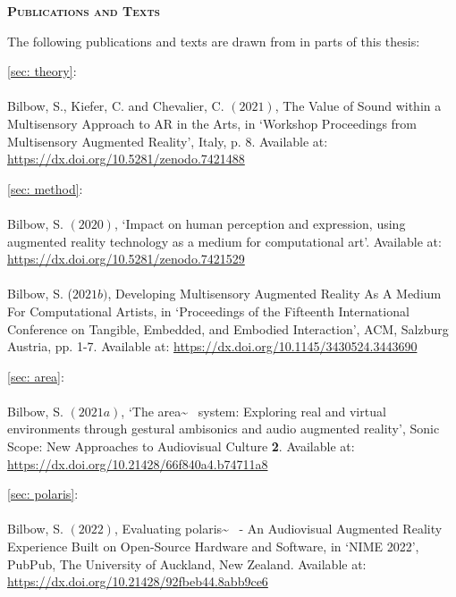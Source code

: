 \newpage
{}
\begin{flushleft}
	\Huge \textsc{\textbf{Publications and Texts}}

\end{flushleft}
\noindent The following publications and texts are drawn from in parts of this thesis:

\noindent\autoref{sec: theory}:  \\ \citep{bilbow2021} \\ Bilbow, S., Kiefer, C. and Chevalier, C. $(2021)$, The Value of Sound within a Multisensory Approach to AR in the Arts, in `Workshop Proceedings from Multisensory Augmented Reality', Italy, p. 8. Available at: \url{https://dx.doi.org/10.5281/zenodo.7421488}
    
\vspace*{0.75cm}
\noindent\autoref{sec: method}:  \\ \citep{bilbow2020,bilbow2021b} \\ Bilbow, S. $(2020)$, `Impact on human perception and expression, using augmented reality technology as a medium for computational art'. Available at: \url{https://dx.doi.org/10.5281/zenodo.7421529} \\ \\ Bilbow, S. ($2021b)$, Developing Multisensory Augmented Reality As A Medium For Computational Artists, in `Proceedings of the Fifteenth International Conference on Tangible, Embedded, and Embodied Interaction', ACM, Salzburg Austria, pp. 1-7. Available at: \url{https://dx.doi.org/10.1145/3430524.3443690}
    
\vspace*{0.75cm}
\noindent\autoref{sec: area}:  \\ \citep{bilbow2021a} \\ Bilbow, S. $(2021a)$, `The area\textasciitilde{}~ system: Exploring real and virtual environments through gestural ambisonics and audio augmented reality', Sonic Scope: New Approaches to Audiovisual Culture \textbf{2}. Available at: \url{https://dx.doi.org/10.21428/66f840a4.b74711a8}
    
\vspace*{0.75cm}
\noindent\autoref{sec: polaris}:  \\ \citep{bilbow2022} \\ Bilbow, S. $(2022)$, Evaluating polaris\textasciitilde{}~ - An Audiovisual Augmented Reality Experience Built on Open-Source Hardware and Software, in `NIME 2022', PubPub, The University of Auckland, New Zealand. Available at: \url{https://dx.doi.org/10.21428/92fbeb44.8abb9ce6}
